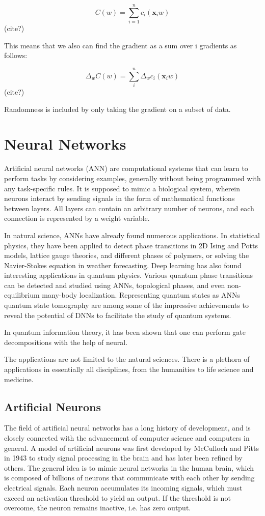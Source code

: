 \begin{equation}
	C(w) = \sum\limits_{i=1}^n c_i (\mathbf{x}_iw)
\end{equation} (cite?)

This means that we also can find the gradient as a sum over i gradients
as follows:

\begin{equation}
	\Delta_{w} C(w) = \sum\limits_{i}^n \Delta_{w}c_i (\mathbf{x}_iw)
\end{equation} (cite?)

Randomness is included by only taking the gradient on a subset of data.

\section{Neural Networks}
Artificial neural networks (ANN) are computational systems that can learn to
perform tasks by considering examples, generally without being
programmed with any task-specific rules. It is supposed to mimic a
biological system, wherein neurons interact by sending signals in the
form of mathematical functions between layers. All layers can contain
an arbitrary number of neurons, and each connection is represented by
a weight variable.

In natural science, ANNs have already found numerous
applications. In statistical physics, they have been applied to detect
phase transitions in 2D Ising and Potts models, lattice gauge
theories, and different phases of polymers, or solving the
Navier-Stokes equation in weather forecasting.  Deep learning has also
found interesting applications in quantum physics. Various quantum
phase transitions can be detected and studied using ANNs,
topological phases, and even non-equilibrium many-body
localization. Representing quantum states as ANNs quantum state
tomography are among some of the impressive achievements to reveal the
potential of DNNs to facilitate the study of quantum systems.

In quantum information theory, it has been shown that one can perform
gate decompositions with the help of neural. 

The applications are not limited to the natural sciences. There is a
plethora of applications in essentially all disciplines, from the
humanities to life science and medicine.

\subsection{Artificial Neurons}
The field of artificial neural networks has a long history of
development, and is closely connected with the advancement of computer
science and computers in general. A model of artificial neurons was
first developed by McCulloch and Pitts in 1943 \cite{McCulloch1943} to study signal
processing in the brain and has later been refined by others. The
general idea is to mimic neural networks in the human brain, which is
composed of billions of neurons that communicate with each other by
sending electrical signals.  Each neuron accumulates its incoming
signals, which must exceed an activation threshold to yield an
output. If the threshold is not overcome, the neuron remains inactive,
i.e. has zero output.

